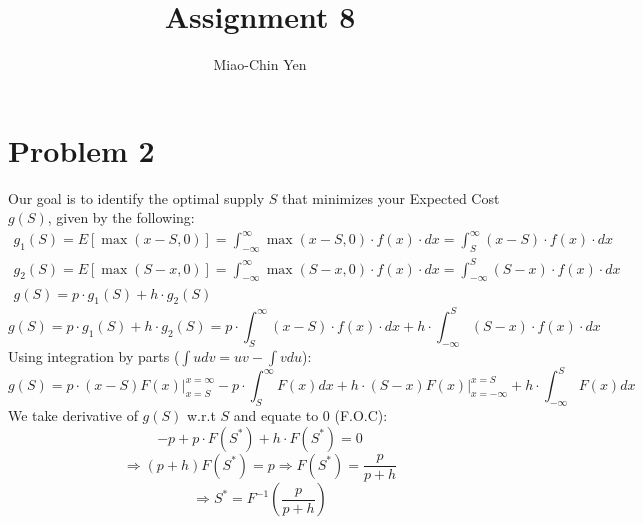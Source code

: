 \documentclass{article}
\title{Assignment 8}
\author{Miao-Chin Yen}
\begin{document}
\maketitle

\section*{Problem 2}
Our goal is to identify the optimal supply $S$ that minimizes your Expected Cost $g(S)$, given by the following:
$$
\begin{gathered}
g_{1}(S)=E[\max (x-S, 0)]=\int_{-\infty}^{\infty} \max (x-S, 0) \cdot f(x) \cdot d x=\int_{S}^{\infty}(x-S) \cdot f(x) \cdot d x \\
g_{2}(S)=E[\max (S-x, 0)]=\int_{-\infty}^{\infty} \max (S-x, 0) \cdot f(x) \cdot d x=\int_{-\infty}^{S}(S-x) \cdot f(x) \cdot d x \\
g(S)=p \cdot g_{1}(S)+h \cdot g_{2}(S)
\end{gathered}
$$
$$g(S)=p \cdot g_{1}(S)+h \cdot g_{2}(S) = p \cdot \int_{S}^{\infty}(x-S) \cdot f(x) \cdot d x + h \cdot \int_{-\infty}^{S}(S-x) \cdot f(x) \cdot d x $$
Using integration by parts ($\int u dv = uv -\int v du$):
$$g(S) = p\cdot (x-S) F(x)\Biggr|_{x=S}^{x=\infty} -p \cdot \int_{S}^{\infty} F(x)dx + h \cdot(S-x)F(x)\Biggr|_{x=-\infty}^{x=S} + h\cdot \int^{S}_{-\infty} F(x)dx$$
We take derivative of $g(S)$ w.r.t $S$ and equate to 0 (F.O.C):
$$-p +p \cdot F(S^{*}) + h \cdot F(S^{*}) = 0 $$
$$\Rightarrow (p+h) F(S^{*}) = p\Rightarrow  F(S^{*}) = \frac{p}{p+h}$$
$$\Rightarrow S^{*} = F^{-1}(\frac{p}{p+h})$$
\end{document}
